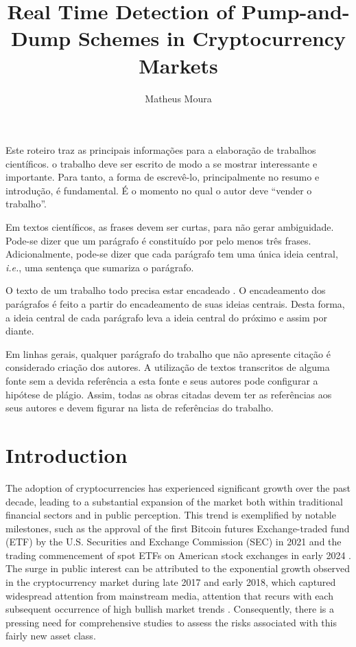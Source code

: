 \documentclass[12pt]{article}
\title{Real Time Detection of Pump-and-Dump Schemes in Cryptocurrency Markets}
\author{Matheus Moura\inst{1}}
\begin{document}
 
	
	\maketitle
	
	\begin{resumo} 
		Este roteiro traz as principais informações para a elaboração de trabalhos científicos. o trabalho deve ser escrito de modo a se mostrar interessante e importante. Para tanto, a forma de escrevê-lo, principalmente no resumo e  introdução, é fundamental. É o momento no qual o autor deve ``vender o trabalho''. 
		
		Em textos científicos, as frases devem ser curtas, para não gerar ambiguidade. Pode-se dizer que um parágrafo é constituído por pelo menos três frases. Adicionalmente, pode-se dizer que cada parágrafo tem uma única ideia central, \emph{i.e.}, uma sentença  que sumariza o parágrafo. 
		
		O texto de um trabalho todo precisa estar encadeado \citep{zobel_writing_2015}. O encadeamento dos parágrafos é feito a partir do encadeamento de suas ideias centrais. Desta forma, a ideia central de cada parágrafo leva a ideia central do próximo e assim por diante. 
		
		Em linhas gerais, qualquer parágrafo do trabalho que não apresente citação é considerado criação dos autores. A utilização de textos transcritos de alguma fonte sem a devida referência a esta fonte e seus autores pode configurar a hipótese de plágio. Assim, todas as obras citadas devem ter as referências aos seus autores e devem figurar na lista de referências do trabalho.
	\end{resumo}
	
	\section{Introduction}
	\label{sec_introducao}

	The adoption of cryptocurrencies has experienced significant growth over the past decade, leading to a substantial expansion of the market both within traditional financial sectors and in public perception.
	This trend is exemplified by notable milestones, such as the approval of the first Bitcoin futures Exchange-traded fund (ETF) by the U.S. Securities and Exchange Commission (SEC) in 2021 \citep{wursthorn2021} and the trading commencement of spot ETFs on American stock exchanges in early 2024 \citep{schmitt2024}.
	The surge in public interest can be attributed to the exponential growth observed in the cryptocurrency market during late 2017 and early 2018, which captured widespread attention from mainstream media, attention that recurs with each subsequent occurrence of high bullish market trends \citep{steinmetz2021}.
	Consequently, there is a pressing need for comprehensive studies to assess the risks associated with this fairly new asset class.
\end{document}
